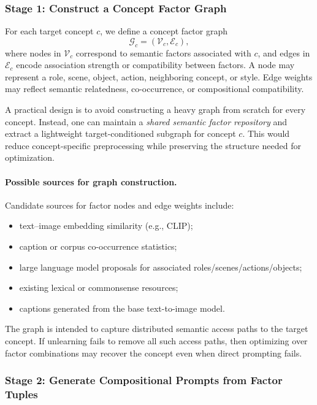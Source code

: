 \subsubsection{Stage 1: Construct a Concept Factor Graph}
\label{subsubsec:stage1_graph}

For each target concept $c$, we define a concept factor graph
\[
\mathcal{G}_c = (\mathcal{V}_c, \mathcal{E}_c),
\]
where nodes in $\mathcal{V}_c$ correspond to semantic factors associated with $c$, and edges in $\mathcal{E}_c$ encode association strength or compatibility between factors. A node may represent a role, scene, object, action, neighboring concept, or style. Edge weights may reflect semantic relatedness, co-occurrence, or compositional compatibility.

A practical design is to avoid constructing a heavy graph from scratch for every concept. Instead, one can maintain a \emph{shared semantic factor repository} and extract a lightweight target-conditioned subgraph for concept $c$. This would reduce concept-specific preprocessing while preserving the structure needed for optimization.

\paragraph{Possible sources for graph construction.}
Candidate sources for factor nodes and edge weights include:
\begin{itemize}
    \item text--image embedding similarity (e.g., CLIP);
    \item caption or corpus co-occurrence statistics;
    \item large language model proposals for associated roles/scenes/actions/objects;
    \item existing lexical or commonsense resources;
    \item captions generated from the base text-to-image model.
\end{itemize}

The graph is intended to capture {distributed semantic access paths} to the target concept. If unlearning fails to remove all such access paths, then optimizing over factor combinations may recover the concept even when direct prompting fails.

\subsubsection{Stage 2: Generate Compositional Prompts from Factor Tuples}
\label{subsubsec:stage2_generation}

